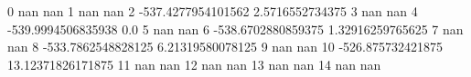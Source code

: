 0 nan nan
1 nan nan
2 -537.4277954101562 2.5716552734375
3 nan nan
4 -539.9994506835938 0.0
5 nan nan
6 -538.6702880859375 1.32916259765625
7 nan nan
8 -533.7862548828125 6.21319580078125
9 nan nan
10 -526.875732421875 13.12371826171875
11 nan nan
12 nan nan
13 nan nan
14 nan nan
